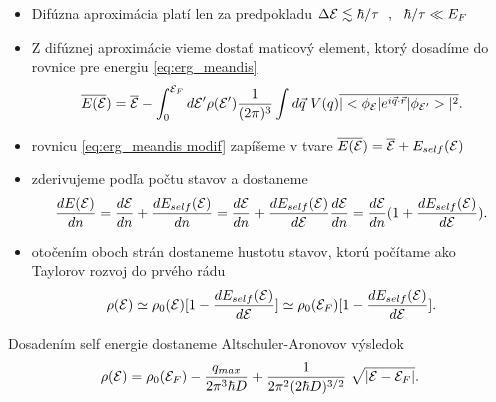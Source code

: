 \documentclass[
	11pt, %
]{beamer}
\begin{document}
\begin{frame}
\begin{itemize}
\item Difúzna aproximácia platí len za predpokladu $ \Delta \mathcal{E} \lesssim \hbar/\tau \ \ , \ \  \hbar/\tau \ll E_F$
\item Z difúznej aproximácie vieme dostať maticový element, ktorý dosadíme  do rovnice pre energiu \eqref{eq:erg_meandis}
\begin{equation}
\label{eq:erg_meandis modif}
 \overline{E(\mathcal{E}})=\overline{\mathcal{E}}-\int_{0}^{\mathcal{E}_F} d\mathcal{E}' \rho(\mathcal{E}') \frac{1}{(2\pi)^{3}} \int d\vec{q}\ V(q) \overline{|<\phi_{\mathcal{E}}|e^{i\vec{q}\cdot\vec{r}}|\phi_{\mathcal{E}'}>|^2} \text{.}
\end{equation}
\item rovnicu \eqref{eq:erg_meandis modif}  zapíšeme v tvare  $\overline{E(\mathcal{E}})=\overline{\mathcal{E}}+E_{self}(\mathcal{E})$
\item zderivujeme podľa počtu stavov a dostaneme 
\begin{equation}
  \frac{d E(\mathcal{E})}{dn}=\frac{d\mathcal{E}}{dn}+\frac{dE_{self}(\mathcal{E})}{dn}=\frac{d\mathcal{E}}{dn}+\frac{dE_{self}(\mathcal{E})}{d\mathcal{E}}\frac{d\mathcal{E}}{dn}=\frac{d\mathcal{E}}{dn}(1+\frac{dE_{self}(\mathcal{E})}{d\mathcal{E}}) \text{.}
\end{equation}
\item otočením oboch strán dostaneme hustotu stavov, ktorú počítame ako Taylorov rozvoj do prvého rádu
\begin{equation}
 \label{eq:aa_dos2}
 \rho(\mathcal{E}) \simeq \rho_0(\mathcal{E})[1-\frac{dE_{self}(\mathcal{E})}{d\mathcal{E}}] \simeq \rho_0(\mathcal{E}_F)[1-\frac{dE_{self}(\mathcal{E})}{d\mathcal{E}}] \text{.}
\end{equation}
\end{itemize}
\end{frame}
\begin{frame}
Dosadením self energie dostaneme Altschuler-Aronovov výsledok
\begin{equation}
 \label{eq:aa_dos3 fin}
 \rho(\E)=\rho_0(\E_F) - \frac{q_{max}}{2\pi^3 \hbar D}
 +    \frac{1}{2\pi^2 (2\hbar D)^{3/2}}  \ \sqrt{|\E-\E_F|}  \text{.}
\end{equation}
\end{frame}
\end{document}

